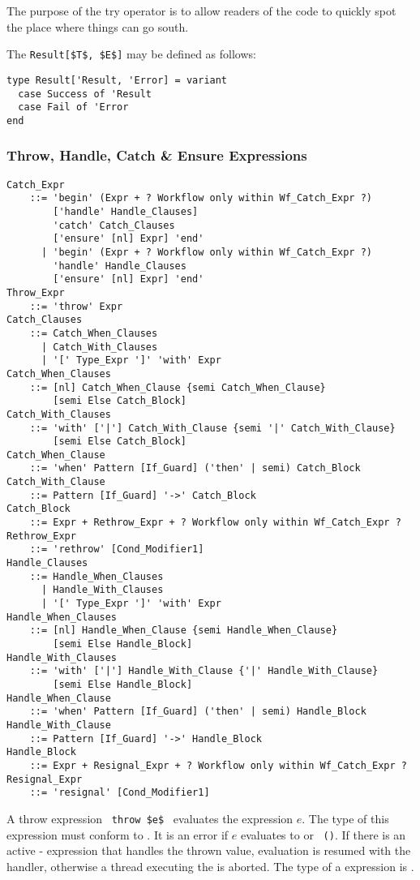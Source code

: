 The purpose of the try operator is to allow readers of the code to quickly spot the place where things can go south.

The \lstinline!Result[$T$, $E$]! may be defined as follows:
\begin{lstlisting}
type Result['Result, 'Error] = variant
  case Success of 'Result
  case Fail of 'Error
end
\end{lstlisting}





\subsubsection{Throw, Handle, Catch \& Ensure Expressions}
\label{sec:throw-catch-expressions}

\grammar\begin{lstlisting}
Catch_Expr
    ::= 'begin' (Expr + ? Workflow only within Wf_Catch_Expr ?)
        ['handle' Handle_Clauses]
        'catch' Catch_Clauses
        ['ensure' [nl] Expr] 'end'
      | 'begin' (Expr + ? Workflow only within Wf_Catch_Expr ?)
        'handle' Handle_Clauses
        ['ensure' [nl] Expr] 'end'
Throw_Expr
    ::= 'throw' Expr
Catch_Clauses 
    ::= Catch_When_Clauses
      | Catch_With_Clauses
      | '[' Type_Expr ']' 'with' Expr
Catch_When_Clauses
    ::= [nl] Catch_When_Clause {semi Catch_When_Clause}
        [semi Else Catch_Block]
Catch_With_Clauses
    ::= 'with' ['|'] Catch_With_Clause {semi '|' Catch_With_Clause}
        [semi Else Catch_Block]
Catch_When_Clause 
    ::= 'when' Pattern [If_Guard] ('then' | semi) Catch_Block
Catch_With_Clause
    ::= Pattern [If_Guard] '->' Catch_Block
Catch_Block 
    ::= Expr + Rethrow_Expr + ? Workflow only within Wf_Catch_Expr ?
Rethrow_Expr
    ::= 'rethrow' [Cond_Modifier1]
Handle_Clauses 
    ::= Handle_When_Clauses
      | Handle_With_Clauses
      | '[' Type_Expr ']' 'with' Expr
Handle_When_Clauses
    ::= [nl] Handle_When_Clause {semi Handle_When_Clause}
        [semi Else Handle_Block]
Handle_With_Clauses
    ::= 'with' ['|'] Handle_With_Clause {'|' Handle_With_Clause}
        [semi Else Handle_Block]
Handle_When_Clause 
    ::= 'when' Pattern [If_Guard] ('then' | semi) Handle_Block
Handle_With_Clause
    ::= Pattern [If_Guard] '->' Handle_Block
Handle_Block
    ::= Expr + Resignal_Expr + ? Workflow only within Wf_Catch_Expr ?
Resignal_Expr 
    ::= 'resignal' [Cond_Modifier1]
\end{lstlisting}

A throw expression ~\lstinline!throw $e$!~ evaluates the expression $e$. The type of this expression must conform to . It is an error if $e$ evaluates to  or ~\lstinline!()!. If there is an active - expression that handles the thrown value, evaluation is resumed with the handler, otherwise a thread executing the  is aborted. The type of a  expression is . 

